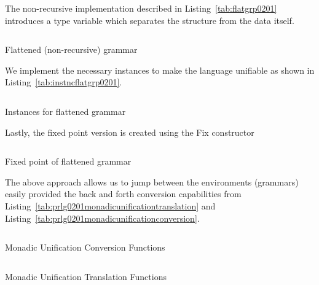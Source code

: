 \documentclass[thesis-solanki.tex]{subfiles}
\begin{document}
The non-recursive implementation described in Listing~\ref{tab:flatgrp0201} introduces a type variable which
separates the structure from the data itself.

\begin{code-list}[H]
  \begin{singlespace}
    \inputminted[linenos]{haskell}{haskell-proto2-flattened-rarefy.hs}
  \end{singlespace}
  \caption{Flattened (non-recursive) grammar}
\label{tab:flatgrp0201}
\end{code-list}

We implement the necessary instances to make the language unifiable as shown in Listing~\ref{tab:instncflatgrp0201}.
\begin{code-list}[H]
  \begin{singlespace}
    \inputminted[linenos,lastline=17]{haskell}{haskell-proto2-flattened-instances.hs}
  \end{singlespace}
  \caption{Instances for flattened grammar}
\label{tab:instncflatgrp0201}
\end{code-list}

Lastly, the fixed point version is created using the Fix constructor
\begin{code-list}[H]
  \begin{singlespace}
    \inputminted[linenos]{haskell}{haskell-proto2-fix-flattened.hs}
  \end{singlespace}
  \caption{Fixed point of flattened grammar}
\label{tab:fixflatgrp0201}
\end{code-list}

The above approach allows us to jump between the environments (grammars) easily provided the back and forth
conversion capabilities from Listing~\ref{tab:prlg0201monadicunificationtranslation} and
Listing~\ref{tab:prlg0201monadicunificationconversion}.

\begin{code-list}[H]
  \begin{singlespace}
    \inputminted[linenos]{haskell}{haskell-proto2-monadic-unification-conversion.hs}
  \end{singlespace}
\caption{ Monadic Unification Conversion Functions}
\label{tab:prlg0201monadicunificationconversion}
\end{code-list}

\begin{code-list}[H]
  \begin{singlespace}
    \inputminted[linenos]{haskell}{haskell-proto2-monadic-unification-translation.hs}
  \end{singlespace}
\caption{ Monadic Unification Translation Functions}
\label{tab:prlg0201monadicunificationtranslation}
\end{code-list}
\end{document}
